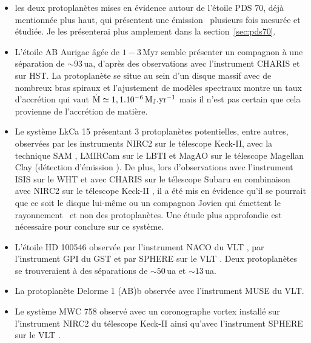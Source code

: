 \begin{itemize}
    \item les deux protoplanètes mises en évidence \citep{keppler2018, muller2018} autour de l'étoile PDS 70, déjà mentionnée plus haut, qui présentent une émission \ha~plusieurs fois mesurée et étudiée. Je les présenterai plus amplement dans la section~\ref{sec:pds70}.

    \item L'étoile AB Aurigae âgée de $1 - 3 \,$Myr semble présenter un compagnon \citep{currie2022b} à une séparation de $\sim 93 \,$ua, d'après des observations avec l'instrument \ac{CHARIS} et sur \ac{HST}. La protoplanète se situe au sein d'un disque massif avec de nombreux bras spiraux et l'ajustement de modèles spectraux montre un taux d'accrétion qui vaut $\dot{\text{M}} \simeq 1,1.10^{-6} \, \text{$\text{M}_\text{J}$}.\text{yr}^{-1}$ mais il n'est pas certain que cela provienne de l'accrétion de matière.
    
    \item Le système LkCa 15 présentant $3$ protoplanètes potentielles, entre autres, observées par les instruments \ac{NIRC2} sur le télescope Keck-II, avec la technique \ac{SAM} \citep{kraus2012}, \ac{LMIRCam} sur le \ac{LBTI} et \ac{MagAO} sur le télescope Magellan Clay \citep{sallum2015} (détection d'émission \ha). De plus, lors d'observations avec l'instrument \ac{ISIS} sur le \ac{WHT} \citep{mendigutia2018} et avec \ac{CHARIS} sur le télescope Subaru en combinaison avec \ac{NIRC2} sur le télescope Keck-II \citep{currie2019}, il a été mis en évidence qu'il se pourrait que ce soit le disque lui-même ou un compagnon Jovien qui émettent le rayonnement \ha~et non des protoplanètes. Une étude plus approfondie est nécessaire pour conclure sur ce système.
    
    \item L'étoile HD 100546 observée par l'instrument \ac{NACO} du \ac{VLT} \citep{quanz2013a, quanz2015}, par l'instrument \ac{GPI} du \ac{GST} \citep{currie2015, follette2017} et par \ac{SPHERE} sur le \ac{VLT} \citep{mendigutia2017}. Deux protoplanètes se trouveraient à des séparations de $\sim 50 \,$ua et $\sim 13 \,$ua.
    
    \item La protoplanète Delorme 1 (AB)b \citep{eriksson2020, ringqvist2021} observée avec l'instrument \ac{MUSE} du \ac{VLT}.
    
    \item Le système MWC 758 observé avec un coronographe vortex installé sur l'instrument \ac{NIRC2} du télescope Keck-II \citep{reggiani2018} ainsi qu'avec l'instrument \ac{SPHERE} sur le \ac{VLT} \citep{cugno2019}.
    

\end{itemize}
